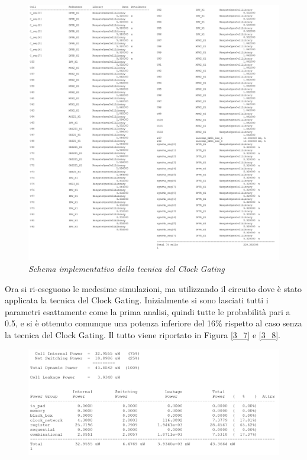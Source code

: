 {\begin{figure}[!htb]
	\centering
	\includegraphics[scale=0.65]{immagini/3_6}
	\caption{\textit{Schema implementativo della tecnica del Clock Gating}}
	\label{3_6}
\end{figure}
\newpage
Ora si ri-eseguono le medesime simulazioni, ma utilizzando il circuito dove è stato applicata la tecnica del Clock Gating. Inizialmente si sono lasciati tutti i parametri esattamente come la prima analisi, quindi tutte le probabilità pari a 0.5, e si è ottenuto comunque una potenza inferiore del 16\% rispetto al caso senza la tecnica del Clock Gating. Il tutto viene riportato in Figura \ref{3_7} e \ref{3_8}. \\
\begin{figure}[!htb]
	\centering
	\includegraphics[scale=0.65]{immagini/3_7}

\end{figure}}

